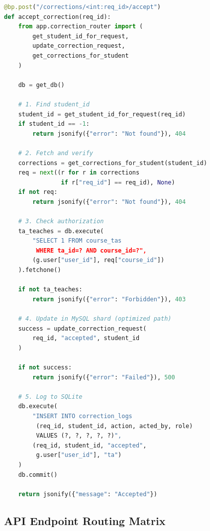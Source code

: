 \documentclass[conference]{IEEEtran}
\begin{document}
\begin{lstlisting}[language=Python]
@bp.post("/corrections/<int:req_id>/accept")
def accept_correction(req_id):
    from app.correction_router import (
        get_student_id_for_request,
        update_correction_request,
        get_corrections_for_student
    )
    
    db = get_db()
    
    # 1. Find student_id
    student_id = get_student_id_for_request(req_id)
    if student_id == -1:
        return jsonify({"error": "Not found"}), 404
    
    # 2. Fetch and verify
    corrections = get_corrections_for_student(student_id)
    req = next((r for r in corrections 
                if r["req_id"] == req_id), None)
    if not req:
        return jsonify({"error": "Not found"}), 404
    
    # 3. Check authorization
    ta_teaches = db.execute(
        "SELECT 1 FROM course_tas 
         WHERE ta_id=? AND course_id=?",
        (g.user["user_id"], req["course_id"])
    ).fetchone()
    
    if not ta_teaches:
        return jsonify({"error": "Forbidden"}), 403
    
    # 4. Update in MySQL shard (optimized path)
    success = update_correction_request(
        req_id, "accepted", student_id
    )
    
    if not success:
        return jsonify({"error": "Failed"}), 500
    
    # 5. Log to SQLite
    db.execute(
        "INSERT INTO correction_logs 
         (req_id, student_id, action, acted_by, role) 
         VALUES (?, ?, ?, ?, ?)",
        (req_id, student_id, "accepted", 
         g.user["user_id"], "ta")
    )
    db.commit()
    
    return jsonify({"message": "Accepted"})
\end{lstlisting}

\subsection{API Endpoint Routing Matrix}
\end{document}
